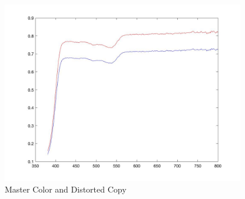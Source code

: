 \documentclass{article}
\begin{document}
\begin{figure}[h]
\center
  \includegraphics[width=300pt]{img/mastercopynoise.jpg}
  \caption{Master Color and Distorted Copy}
  \label{fig:mastercopy}
\end{figure}
\end{document}
